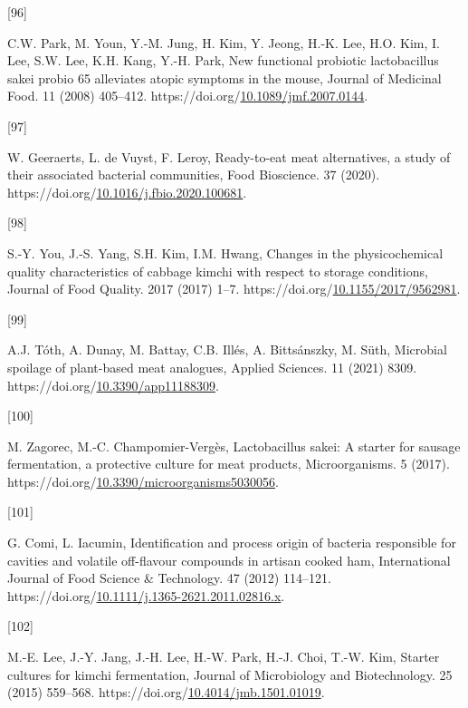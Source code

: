 \documentclass[preprint,3p,
a4paper]{elsarticle} %
\newlength{\cslhangindent}
\newlength{\csllabelwidth}
\newlength{\cslentryspacingunit} %
\newenvironment{CSLReferences}[2] %
 {%
  \setlength{\parindent}{0pt}
  \ifodd #1
  \let\oldpar\par
  \def\par{\hangindent=\cslhangindent\oldpar}
  \fi
  \setlength{\parskip}{#2\cslentryspacingunit}
 }%
 {}
\newcommand{\CSLLeftMargin}[1]{\parbox[t]{\csllabelwidth}{#1}}
\newcommand{\CSLRightInline}[1]{\parbox[t]{\linewidth - \csllabelwidth}{#1}\break}
\begin{document}
\begin{CSLReferences}{0}{0}
\leavevmode{}%
\CSLLeftMargin{{[}96{]} }%
\CSLRightInline{C.W. Park, M. Youn, Y.-M. Jung, H. Kim, Y. Jeong, H.-K.
Lee, H.O. Kim, I. Lee, S.W. Lee, K.H. Kang, Y.-H. Park, New functional
probiotic lactobacillus sakei probio 65 alleviates atopic symptoms in
the mouse, Journal of Medicinal Food. 11 (2008) 405--412.
https://doi.org/\href{https://doi.org/10.1089/jmf.2007.0144}{10.1089/jmf.2007.0144}.}

\leavevmode{}%
\CSLLeftMargin{{[}97{]} }%
\CSLRightInline{W. Geeraerts, L. de Vuyst, F. Leroy, Ready-to-eat meat
alternatives, a study of their associated bacterial communities, Food
Bioscience. 37 (2020).
https://doi.org/\href{https://doi.org/10.1016/j.fbio.2020.100681}{10.1016/j.fbio.2020.100681}.}

\leavevmode{}%
\CSLLeftMargin{{[}98{]} }%
\CSLRightInline{S.-Y. You, J.-S. Yang, S.H. Kim, I.M. Hwang, Changes in
the physicochemical quality characteristics of cabbage kimchi with
respect to storage conditions, Journal of Food Quality. 2017 (2017)
1--7.
https://doi.org/\href{https://doi.org/10.1155/2017/9562981}{10.1155/2017/9562981}.}

\leavevmode{}%
\CSLLeftMargin{{[}99{]} }%
\CSLRightInline{A.J. Tóth, A. Dunay, M. Battay, C.B. Illés, A.
Bittsánszky, M. Süth, Microbial spoilage of plant-based meat analogues,
Applied Sciences. 11 (2021) 8309.
https://doi.org/\href{https://doi.org/10.3390/app11188309}{10.3390/app11188309}.}

\leavevmode{}%
\CSLLeftMargin{{[}100{]} }%
\CSLRightInline{M. Zagorec, M.-C. Champomier-Vergès, Lactobacillus
sakei: A starter for sausage fermentation, a protective culture for meat
products, Microorganisms. 5 (2017).
https://doi.org/\href{https://doi.org/10.3390/microorganisms5030056}{10.3390/microorganisms5030056}.}

\leavevmode{}%
\CSLLeftMargin{{[}101{]} }%
\CSLRightInline{G. Comi, L. Iacumin, Identification and process origin
of bacteria responsible for cavities and volatile off-flavour compounds
in artisan cooked ham, International Journal of Food Science {\&}
Technology. 47 (2012) 114--121.
https://doi.org/\href{https://doi.org/10.1111/j.1365-2621.2011.02816.x}{10.1111/j.1365-2621.2011.02816.x}.}

\leavevmode{}%
\CSLLeftMargin{{[}102{]} }%
\CSLRightInline{M.-E. Lee, J.-Y. Jang, J.-H. Lee, H.-W. Park, H.-J.
Choi, T.-W. Kim, Starter cultures for kimchi fermentation, Journal of
Microbiology and Biotechnology. 25 (2015) 559--568.
https://doi.org/\href{https://doi.org/10.4014/jmb.1501.01019}{10.4014/jmb.1501.01019}.}


\end{CSLReferences}
\end{document}
